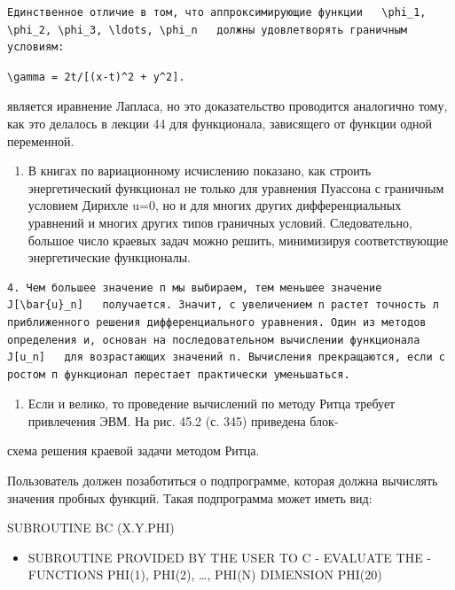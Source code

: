 \documentclass[
  ukrainian,
]{article}
\providecommand{\tightlist}{%
  \setlength{\itemsep}{0pt}\setlength{\parskip}{0pt}}
\begin{document}
\begin{verbatim}
Единственное отличие в том, что аппроксимирующие функции   \phi_1, \phi_2, \phi_3, \ldots, \phi_n   должны удовлетворять граничным условиям:
\end{verbatim}

\begin{verbatim}
\gamma = 2t/[(x-t)^2 + y^2].
\end{verbatim}

является иравнение Лапласа, но это доказательство проводится аналогично
тому, как это делалось в лекции 44 для функционала, зависящего от
функции одной переменной.

\begin{enumerate}
\def\labelenumi{\arabic{enumi}.}
\setcounter{enumi}{2}
\tightlist
\item
  В книгах по вариационному исчислению показано, как строить
  энергетический функционал не только для уравнения Пуассона с граничным
  условием Дирихле u=0, но и для многих других дифференциальных
  уравнений и многих других типов граничных условий. Следовательно,
  большое число краевых задач можно решить, минимизируя соответствующие
  энергетические функционалы.
\end{enumerate}

\begin{verbatim}
4. Чем большее значение п мы выбираем, тем меньшее значение   J[\bar{u}_n]   получается. Значит, с увеличением n растет точность л приближенного решения дифференциального уравнения. Один из методов определения и, основан на последовательном вычислении функционала   J[u_n]   для возрастающих значений n. Вычисления прекращаются, если с ростом п функционал перестает практически уменьшаться.
\end{verbatim}

\begin{enumerate}
\def\labelenumi{\arabic{enumi}.}
\setcounter{enumi}{4}
\tightlist
\item
  Если и велико, то проведение вычислений по методу Ритца требует
  привлечения ЭВМ. На рис. 45.2 (с. 345) приведена блок-
\end{enumerate}

схема решения краевой задачи методом Ритца.

Пользователь должен позаботиться о подпрограмме, которая должна
вычислять значения пробных функций. Такая подпрограмма может иметь вид:

SUBROUTINE BC (X.Y.PHI)

\begin{itemize}
\tightlist
\item
  SUBROUTINE PROVIDED BY THE USER TO C - EVALUATE THE - FUNCTIONS
  PHI(1), PHI(2), \ldots, PHI(N) DIMENSION PHI(20)
\end{itemize}
\end{document}
